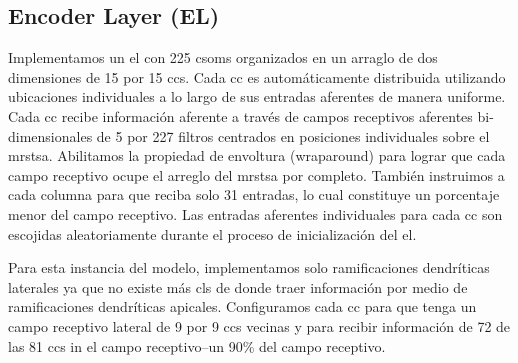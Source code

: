 



\subsection{Encoder Layer (EL)}

Implementamos un \gls{el} con 225 \glspl{csom} organizados en un arraglo de dos dimensiones de 15 por 15 \glspl{cc}.
Cada \gls{cc} es automáticamente distribuida utilizando ubicaciones individuales a lo largo de sus entradas aferentes de manera uniforme.
Cada \gls{cc} recibe información aferente a través de campos receptivos aferentes bi-dimensionales de 5 por 227 filtros centrados en posiciones individuales sobre el \gls{mrstsa}.
Abilitamos la propiedad de envoltura (wraparound) para lograr que cada campo receptivo ocupe el arreglo del \gls{mrstsa} por completo.
También instruimos a cada columna para que reciba solo 31 entradas, lo cual constituye un porcentaje menor del campo receptivo.
Las entradas aferentes individuales para cada \gls{cc} son escojidas aleatoriamente durante el proceso de inicialización del \gls{el}.

Para esta instancia del modelo, implementamos solo ramificaciones dendríticas laterales ya que no existe más \glspl{cl} de donde traer información por medio de ramificaciones dendríticas apicales.
Configuramos cada \gls{cc} para que tenga un campo receptivo lateral de 9 por 9 \glspl{cc} vecinas y para recibir información de 72 de las 81 \glspl{cc} in el campo receptivo--un 90\% del campo receptivo.


